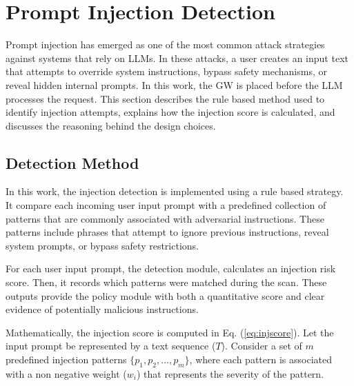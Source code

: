 \documentclass[conference]{IEEEtran}
\begin{document}

\section{Prompt Injection Detection}
\label{sec:injdet}

Prompt injection has emerged as one of the most common attack strategies against systems that rely on LLMs. In these attacks, a user creates an input text that attempts to override system instructions, bypass safety mechanisms, or reveal hidden internal prompts. In this work, the GW is placed before the LLM processes the request. This section describes the rule based method used to identify injection attempts, explains how the injection score is calculated, and discusses the reasoning behind the design choices.

\subsection{Detection Method}

In this work, the injection detection is implemented using a rule based strategy. It compare each incoming user input prompt with a predefined collection of patterns that are commonly associated with adversarial instructions. These patterns include phrases that attempt to ignore previous instructions, reveal system prompts, or bypass safety restrictions.

For each user input prompt, the detection module, calculates an injection risk score. Then, it records which patterns were matched during the scan. These outputs provide the policy module with both a quantitative score and clear evidence of potentially malicious instructions.

Mathematically, the injection score is computed in Eq. (\ref{eq:injscore}). Let the input prompt be represented by a text sequence ($T$). Consider a set of $m$ predefined injection patterns $\{p_1, p_2, \dots, p_m\}$, where each pattern is associated with a non negative weight ($w_i$) that represents the severity of the pattern. 
\end{document}
